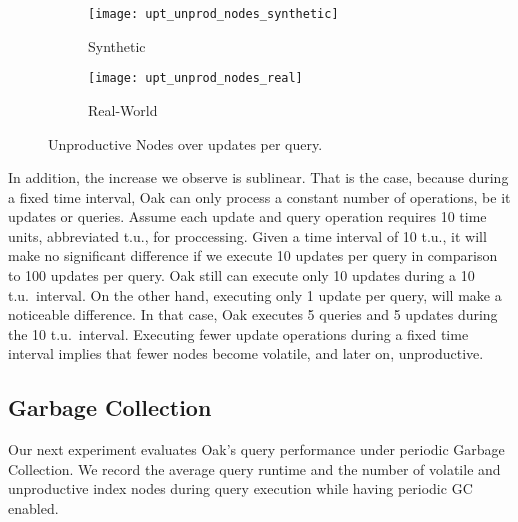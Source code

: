 \documentclass[abstracton,12pt]{scrartcl}
\theoremstyle{definition}
\begin{document}
\begin{figure}[h]
  \centering
  \begin{subfigure}{0.49\linewidth}
    \centering
    \caption{Synthetic}
    \texttt{[image: upt\_unprod\_nodes\_synthetic]}
    \label{fig:upt_unprod_nodes_synthetic}
  \end{subfigure}
  \begin{subfigure}{0.49\linewidth}
    \centering
    \caption{Real-World}
    \texttt{[image: upt\_unprod\_nodes\_real]}
    \label{fig:upt_unprod_nodes_real}
  \end{subfigure}
  \vspace{-0.65cm}
  \caption[Unproductive Nodes over updates per query]{
  Unproductive Nodes over updates per query.}
\end{figure}

In addition, the increase we observe is sublinear. 
That is the case, because during a fixed time interval, Oak can only
process a constant number of operations, be it updates or queries.
Assume each update and query operation requires 10 time units, abbreviated t.u.,
for proccessing. Given a time interval of 10 t.u., it will make no significant
difference if we execute 10 updates per query in comparison to 100 updates
per query. Oak still can execute only 10 updates during a 10 t.u.\ interval.
On the other hand, executing only 1 update per query, will make a noticeable
difference. In that case, Oak executes 5 queries and 5 updates during the 10
t.u.\ interval. Executing fewer update operations during a fixed time interval
implies that fewer nodes become volatile, and later on, unproductive.


\subsection{Garbage Collection}

\label{sec:gc-experiment}

Our next experiment evaluates Oak's query performance under periodic Garbage Collection.
We record the average query runtime and the number of volatile and unproductive 
index nodes during query execution while having periodic GC enabled.
\end{document}
